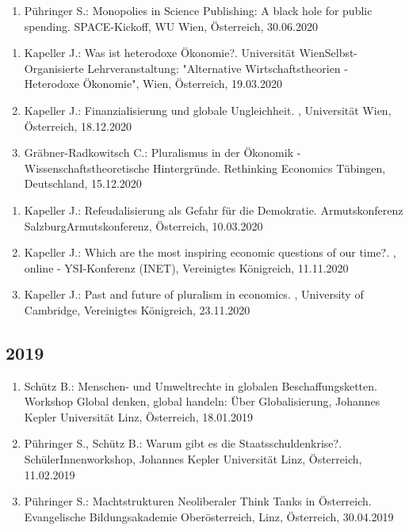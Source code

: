 \begin{enumerate}
	\item Pühringer S.: Monopolies in Science Publishing: A black hole for public spending. SPACE-Kickoff, WU Wien, Österreich, 30.06.2020
\end{enumerate}

\begin{enumerate}
	\item Kapeller J.: Was ist heterodoxe Ökonomie?. Universität WienSelbst-Organisierte Lehrveranstaltung: "Alternative Wirtschaftstheorien - Heterodoxe Ökonomie", Wien, Österreich, 19.03.2020
	\item Kapeller J.: Finanzialisierung und globale Ungleichheit. , Universität Wien, Österreich, 18.12.2020
	\item Gräbner-Radkowitsch C.: Pluralismus in der Ökonomik - Wissenschaftstheoretische Hintergründe. Rethinking Economics Tübingen, Deutschland, 15.12.2020
\end{enumerate}

\begin{enumerate}
	\item Kapeller J.: Refeudalisierung als Gefahr für die Demokratie. Armutskonferenz SalzburgArmutskonferenz, Österreich, 10.03.2020
	\item Kapeller J.: Which are the most inspiring economic questions of our time?. , online - YSI-Konferenz (INET), Vereinigtes Königreich, 11.11.2020
	\item Kapeller J.: Past and future of pluralism in economics. , University of Cambridge, Vereinigtes Königreich, 23.11.2020
\end{enumerate}
\subsection*{2019}

\begin{enumerate}
	\item Schütz B.: Menschen- und Umweltrechte in globalen Beschaffungsketten. Workshop Global denken, global handeln: Über Globalisierung, Johannes Kepler Universität Linz, Österreich, 18.01.2019
	\item Pühringer S., Schütz B.: Warum gibt es die Staatsschuldenkrise?. SchülerInnenworkshop, Johannes Kepler Universität Linz, Österreich, 11.02.2019
	\item Pühringer S.: Machtstrukturen Neoliberaler Think Tanks in Österreich. Evangelische Bildungsakademie Oberösterreich, Linz, Österreich, 30.04.2019
\end{enumerate}

